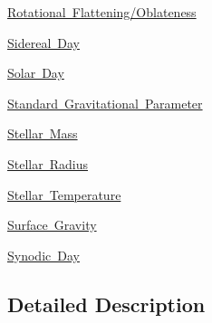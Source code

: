 \begin{DoxyCompactItemize}
\mbox{\hyperlink{group___e_g_x_phys-_astrophysics-_rotational_flattening}{Rotational Flattening/\+Oblateness}}
\item 
\mbox{\hyperlink{group___e_g_x_phys-_astrophysic-_sidereal_day}{Sidereal Day}}
\item 
\mbox{\hyperlink{group___e_g_x_phys-_astrophysic-_solar_day}{Solar Day}}
\item 
\mbox{\hyperlink{group___e_g_x_phys-_astrophysics-_standard_gravitational_parameter}{Standard Gravitational Parameter}}
\item 
\mbox{\hyperlink{group___e_g_x_phys-_stellar_mass}{Stellar Mass}}
\item 
\mbox{\hyperlink{group___e_g_x_phys-_stellar_radius}{Stellar Radius}}
\item 
\mbox{\hyperlink{group___e_g_x_phys-_stellar_temperature}{Stellar Temperature}}
\item 
\mbox{\hyperlink{group___e_g_x_phys-_astrophysics-_surface_gravity}{Surface Gravity}}
\item 
\mbox{\hyperlink{group___e_g_x_phys-_astrophysic-_synodic_day}{Synodic Day}}
\end{DoxyCompactItemize}


\subsection{Detailed Description}
